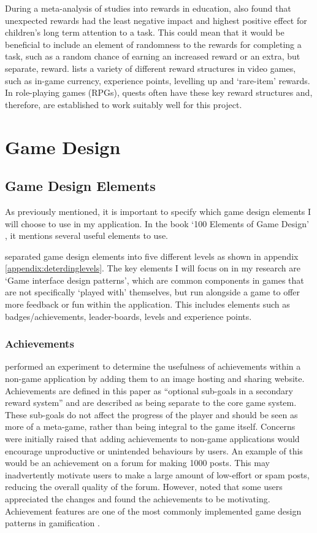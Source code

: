 During a meta-analysis of studies into rewards in education, \cite{deci2001extrinsic} also found that unexpected rewards had the least negative impact and highest positive effect for children's long term attention to a task. 
This could mean that it would be beneficial to include an element of randomness to the rewards for completing a task, such as a random chance of earning an increased reward or an extra, but separate, reward.
\cite{king2010video} lists a variety of different reward structures in video games, such as in-game currency, experience points, levelling up and `rare-item' rewards. 
In role-playing games (RPGs), quests often have these key reward structures and, therefore, are established to work suitably well for this project.

\section{Game Design}
\subsection{Game Design Elements}
As previously mentioned, it is important to specify which game design elements I will choose to use in my application.
In the book `100 Elements of Game Design' \citep{despain2012100}, it mentions several useful elements to use.

\cite{Deterding:2011:GDE:2181037.2181040} separated game design elements into five different levels as shown in appendix \ref{appendix:deterdinglevels}.
The key elements I will focus on in my research are `Game interface design patterns', which are common components in games that are not specifically `played with' themselves, but run alongside a game to offer more feedback or fun within the application.
This includes elements such as badges/achievements, leader-boards, levels and experience points. 

\subsubsection{Achievements}
\citet[p.94]{Montola:2009:AGA:1621841.1621859} performed an experiment to determine the usefulness of achievements within a non-game application by adding them to an image hosting and sharing website.
Achievements are defined in this paper as ``optional sub-goals in a secondary reward system'' and are described as being separate to the core game system.
These sub-goals do not affect the progress of the player and should be seen as more of a meta-game, rather than being integral to the game itself.
Concerns were initially raised that adding achievements to non-game applications would encourage unproductive or unintended behaviours by users. An example of this would be an achievement on a forum for making 1000 posts. This may inadvertently motivate users to make a large amount of low-effort or spam posts, reducing the overall quality of the forum.
However, \cite{Montola:2009:AGA:1621841.1621859} noted that some users appreciated the changes and found the achievements to be motivating.
Achievement features are one of the most commonly implemented game design patterns in gamification \citep{hamari2011framework}. 

